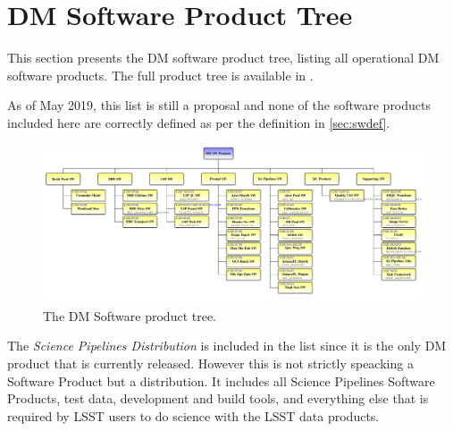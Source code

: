 \newpage
\section{DM Software Product Tree}\label{sec:swptree}

This section presents the \gls{DM} software product tree, listing all operational \gls{DM} software products.
The full product tree is available in .

As of May 2019, this list is still a proposal and none of the software products included here are correctly defined as per the definition in \ref{sec:swdef}.



\begin{figure}
\begin{center}
 \includegraphics[width=1.1\textwidth]{ProductTreeLand}

 \caption{The \gls{DM} Software product tree.}
 \label{fig:doctree}

\end{center}
\end{figure}

The \textit{Science Pipelines Distribution} is included in the list since it is the only \gls{DM} product that is currently released.
However this is not strictly speacking a Software Product but a distribution.
It includes all Science Pipelines Software Products, test data, development and build tools, and everything else that is required by \gls{LSST} users to do science with the \gls{LSST} data products.
